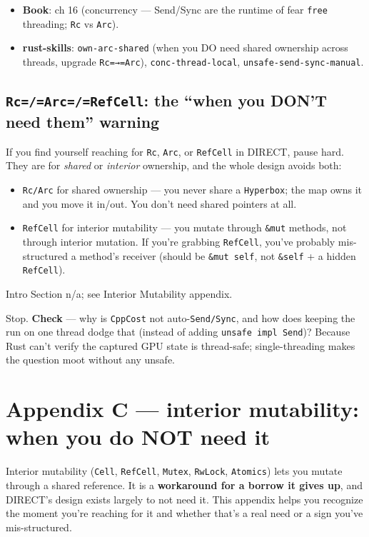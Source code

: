 \documentclass[11pt]{article}
\begin{document}
\begin{itemize}
\item \textbf{\textbf{Book}}: ch 16 (concurrency — Send/Sync are the runtime of fear \texttt{free}
threading; \texttt{Rc} vs \texttt{Arc}).
\item \textbf{\textbf{rust-skills}}: \texttt{own-arc-shared} (when you DO need shared ownership across
threads, upgrade \texttt{Rc=→=Arc}), \texttt{conc-thread-local}, \texttt{unsafe-send-sync-manual}.
\end{itemize}
\subsection{\texttt{Rc=/=Arc=/=RefCell}: the ``when you DON'T need them'' warning}
\label{sec:org27e1f61}

If you find yourself reaching for \texttt{Rc}, \texttt{Arc}, or \texttt{RefCell} in DIRECT, pause
hard. They are for \emph{shared} or \emph{interior} ownership, and the whole design avoids
both:

\begin{itemize}
\item \texttt{Rc/Arc} for shared ownership — you never share a \texttt{Hyperbox}; the map owns it
and you move it in/out. You don't need shared pointers at all.
\item \texttt{RefCell} for interior mutability — you mutate through \texttt{\&mut} methods, not
through interior mutation. If you're grabbing \texttt{RefCell}, you've probably
mis-structured a method's receiver (should be \texttt{\&mut self}, not \texttt{\&self} + a
hidden \texttt{RefCell}).
\end{itemize}

Intro Section n/a; see Interior Mutability appendix.

Stop. \textbf{\textbf{Check}} — why is \texttt{CppCost} not auto-\texttt{Send/Sync}, and how does keeping
the run on one thread dodge that (instead of adding \texttt{unsafe impl Send})? Because
Rust can't verify the captured GPU state is thread-safe; single-threading makes
the question moot without any unsafe.
\section{Appendix C — interior mutability: when you do NOT need it}
\label{sec:org7b1ed64}

Interior mutability (\texttt{Cell}, \texttt{RefCell}, \texttt{Mutex}, \texttt{RwLock}, \texttt{Atomics}) lets you
mutate through a shared reference. It is a \textbf{workaround for a borrow it gives
up}, and DIRECT's design exists largely to not need it. This appendix helps you
recognize the moment you're reaching for it and whether that's a real need or a
sign you've mis-structured.
\end{document}
